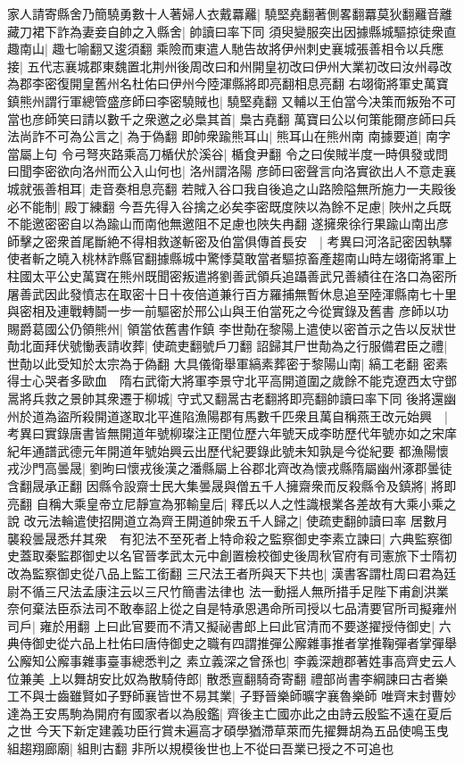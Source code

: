 家人請寄縣舍乃簡驍勇數十人著婦人衣戴羃䍦|{
	驍堅堯翻著側畧翻羃莫狄翻䍦音離}
藏刀裙下詐為妻妾自帥之入縣舍|{
	帥讀曰率下同}
須臾變服突出因據縣城驅掠徒衆直趣南山|{
	趣七喻翻又逡須翻}
乘險而東遣人馳告故將伊州刺史襄城張善相令以兵應接|{
	五代志襄城郡東魏置北荆州後周改曰和州開皇初改曰伊州大業初改曰汝州尋改為郡李密復開皇舊州名杜佑曰伊州今陸渾縣將即亮翻相息亮翻}
右翊衛將軍史萬寶鎮熊州謂行軍總管盛彦師曰李密驍賊也|{
	驍堅堯翻}
又輔以王伯當今决策而叛殆不可當也彦師笑曰請以數千之衆邀之必梟其首|{
	梟古堯翻}
萬寶曰公以何策能爾彦師曰兵法尚詐不可為公言之|{
	為于偽翻}
即帥衆踰熊耳山|{
	熊耳山在熊州南}
南據要道|{
	南字當屬上句}
令弓弩夾路乘高刀楯伏於溪谷|{
	楯食尹翻}
令之曰俟賊半度一時俱發或問曰聞李密欲向洛州而公入山何也|{
	洛州謂洛陽}
彦師曰密聲言向洛實欲出人不意走襄城就張善相耳|{
	走音奏相息亮翻}
若賊入谷口我自後追之山路險隘無所施力一夫殿後必不能制|{
	殿丁練翻}
今吾先得入谷擒之必矣李密既度陜以為餘不足慮|{
	陜州之兵既不能邀密密自以為踰山而南他無邀阻不足慮也陜失冉翻}
遂擁衆徐行果踰山南出彦師擊之密衆首尾斷絶不得相救遂斬密及伯當俱傳首長安　|{
	考異曰河洛記密因執驛使者斬之曉入桃林詐縣官翻據縣城中驚悸莫敢當者驅掠畜產趨南山時左翊衛將軍上柱國太平公史萬寶在熊州既聞密叛遣將劉善武領兵追躡善武兄善績往在洛口為密所屠善武因此發憤志在取密十日十夜倍道兼行百方羅捕無暫休息追至陸渾縣南七十里與密相及連戰轉鬬一步一前驅密於邢公山與王伯當死之今從實錄及舊書}
彦師以功賜爵葛國公仍領熊州|{
	領當依舊書作鎮}
李世勣在黎陽上遣使以密首示之告以反狀世勣北面拜伏號慟表請收葬|{
	使疏吏翻號戶刀翻}
詔歸其尸世勣為之行服備君臣之禮|{
	世勣以此受知於太宗為于偽翻}
大具儀衛舉軍縞素葬密于黎陽山南|{
	縞工老翻}
密素得士心哭者多歐血　隋右武衛大將軍李景守北平高開道圍之歲餘不能克遼西太守鄧暠將兵救之景帥其衆遷于柳城|{
	守式又翻暠古老翻將即亮翻帥讀曰率下同}
後將還幽州於道為盜所殺開道遂取北平進陷漁陽郡有馬數千匹衆且萬自稱燕王改元始興　|{
	考異曰實錄唐書皆無開道年號柳璨注正閏位歷六年號天成李昉歷代年號亦如之宋庠紀年通譜武德元年開道年號始興云出歷代紀要錄此號未知孰是今從紀要}
都漁陽懷戎沙門高曇晟|{
	劉昫曰懷戎後漢之潘縣屬上谷郡北齊改為懷戎縣隋屬幽州涿郡曇徒含翻晟承正翻}
因縣令設齋士民大集曇晟與僧五千人擁齋衆而反殺縣令及鎮將|{
	將即亮翻}
自稱大乘皇帝立尼靜宣為邪輸皇后|{
	釋氏以人之性識根業各差故有大乘小乘之說}
改元法輪遣使招開道立為齊王開道帥衆五千人歸之|{
	使疏吏翻帥讀曰率}
居數月襲殺曇晟悉幷其衆　有犯法不至死者上特命殺之監察御史李素立諫曰|{
	六典監察御史蓋取秦監郡御史以名官晉孝武太元中創置檢校御史後周秋官府有司憲旅下士隋初改為監察御史從八品上監工銜翻}
三尺法王者所與天下共也|{
	漢書客謂杜周曰君為廷尉不循三尺法孟康注云以三尺竹簡書法律也}
法一動揺人無所措手足陛下甫創洪業奈何棄法臣忝法司不敢奉詔上從之自是特承恩遇命所司授以七品清要官所司擬雍州司戶|{
	雍於用翻}
上曰此官要而不清又擬祕書郎上曰此官清而不要遂擢授侍御史|{
	六典侍御史從六品上杜佑曰唐侍御史之職有四謂推彈公廨雜事推者掌推鞠彈者掌彈舉公廨知公廨事雜事臺事總悉判之}
素立義深之曾孫也|{
	李義深趙郡著姓事高齊史云人位兼美}
上以舞胡安比奴為散騎侍郎|{
	散悉亶翻騎奇寄翻}
禮部尚書李綱諫曰古者樂工不與士齒雖賢如子野師襄皆世不易其業|{
	子野晉樂師曠字襄魯樂師}
唯齊末封曹妙達為王安馬駒為開府有國家者以為殷鑑|{
	齊後主亡國亦此之由詩云殷監不遠在夏后之世}
今天下新定建義功臣行賞未遍高才碩學猶滯草萊而先擢舞胡為五品使鳴玉曳組趨翔廊廟|{
	組則古翻}
非所以規模後世也上不從曰吾業已授之不可追也

